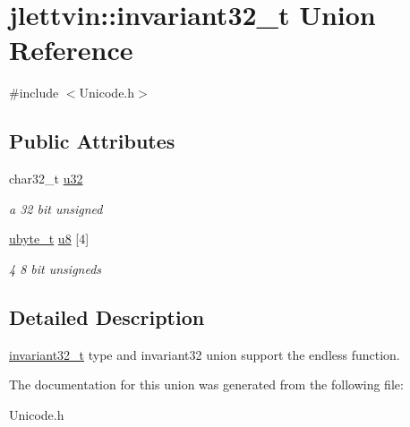 \hypertarget{unionjlettvin_1_1invariant32__t}{}\section{jlettvin\+:\+:invariant32\+\_\+t Union Reference}
\label{unionjlettvin_1_1invariant32__t}


{\ttfamily \#include $<$Unicode.\+h$>$}

\subsection*{Public Attributes}
\begin{DoxyCompactItemize}
\item 
\hypertarget{unionjlettvin_1_1invariant32__t_a6b960207500139b0240058e81b9cb187}{}char32\+\_\+t \hyperlink{unionjlettvin_1_1invariant32__t_a6b960207500139b0240058e81b9cb187}{u32}\label{unionjlettvin_1_1invariant32__t_a6b960207500139b0240058e81b9cb187}

\begin{DoxyCompactList}\small\item\em a 32 bit unsigned \end{DoxyCompactList}\item 
\hypertarget{unionjlettvin_1_1invariant32__t_a322c53bdb0d61ba37b80d1a0b8f6040e}{}\hyperlink{namespacejlettvin_a7c7cf84f4fd67858c46a1077ed2e3ad4}{ubyte\+\_\+t} \hyperlink{unionjlettvin_1_1invariant32__t_a322c53bdb0d61ba37b80d1a0b8f6040e}{u8} \mbox{[}4\mbox{]}\label{unionjlettvin_1_1invariant32__t_a322c53bdb0d61ba37b80d1a0b8f6040e}

\begin{DoxyCompactList}\small\item\em 4 8 bit unsigneds \end{DoxyCompactList}\end{DoxyCompactItemize}


\subsection{Detailed Description}
\hyperlink{unionjlettvin_1_1invariant32__t}{invariant32\+\_\+t} type and invariant32 union support the endless function. 

The documentation for this union was generated from the following file\+:\begin{DoxyCompactItemize}
\item 
Unicode.\+h\end{DoxyCompactItemize}
